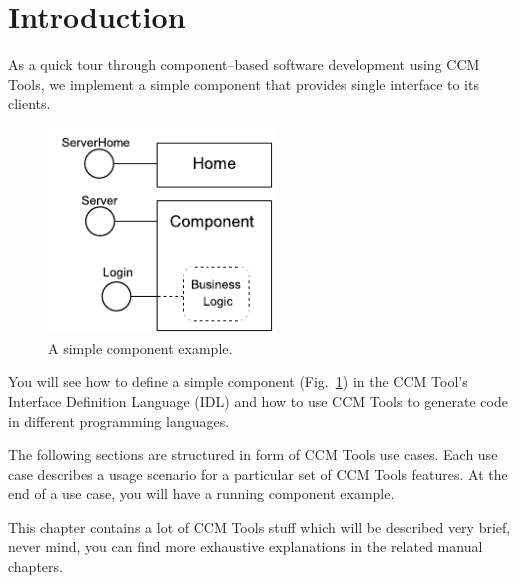 \section{Introduction}
\label{section:Introduction}

As a quick tour through component--based software development using CCM Tools,
we implement a simple component that provides single interface to its clients.

\begin{figure}[htbp]
    \begin{center}
        \includegraphics [width=6cm,angle=0] {figures/LoginComponentExample}
        \caption{ A simple component example.}
        \label{figure:SimpleComponentExample}
    \end{center}
\end{figure}

You will see how to define a simple component
(Fig.~\ref{figure:SimpleComponentExample}) in the CCM Tool's Interface
Definition Language (IDL) and how to use CCM Tools to generate code
in different programming languages.

\vspace{3mm}
The following sections are structured in form of CCM Tools use cases. Each use
case describes a usage scenario for a particular set of CCM Tools features. 
At the end of a use case, you will have a running component example.

\vspace{3mm}
This chapter contains a lot of CCM Tools stuff which will be described very
brief, never mind, you can find more exhaustive 	explanations in the related
manual chapters. 


\newpage


